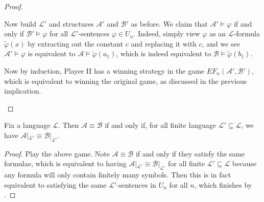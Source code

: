 \documentclass[../notes.tex]{subfiles}
\begin{document}
\begin{proof}
\begin{itemize}
		Now build $\mathcal L'$ and structures $\mathcal A'$ and $\mathcal B'$ as before. We claim that $\mathcal A'\models\varphi$ if and only if $\mathcal B'\models\varphi$ for all $\mathcal L'$-sentences $\varphi\in U_n$. Indeed, simply view $\varphi$ as an $\mathcal L$-formula $\widetilde\varphi(x)$ by extracting out the constant $c$ and replacing it with $c$, and we see $\mathcal A'\models\varphi$ is equivalent to $\mathcal A\models\widetilde\varphi(a_1)$, which is indeed equivalent to $\mathcal B\models\widetilde\varphi(b_1)$.

		Now by induction, Player II has a winning strategy in the game $EF_n(\mathcal A',\mathcal B')$, which is equivalent to winning the original game, as discussed in the previous implication.
		\qedhere
	\end{itemize}
\end{proof}
\begin{corollary}
	Fix a language $\mathcal L$. Then $\mathcal A\equiv\mathcal B$ if and only if, for all finite language $\mathcal L'\subseteq\mathcal L$, we have $\mathcal A|_{\mathcal L'}\equiv\mathcal B|_{\mathcal L'}$.
\end{corollary}
\begin{proof}
	Play the above game. Note $\mathcal A\equiv\mathcal B$ if and only if they satisfy the same formulae, which is equivalent to having $\mathcal A|_{\mathcal L'}\equiv\mathcal B|_{\mathcal L'}$ for all finite $\mathcal L'\subseteq\mathcal L$ because any formula will only contain finitely many symbols. Then this is in fact equivalent to satisfying the same $\mathcal L'$-sentences in $U_n$ for all $n$, which finishes by .
\end{proof}
\end{document}
